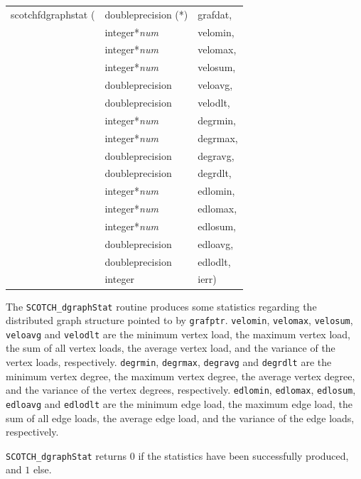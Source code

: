 \begin{itemize}
{\tt\begin{tabular}{l@{}ll}
scotchfdgraphstat ( & doubleprecision (*) & grafdat, \\
                    & integer*{\it num}   & velomin, \\
                    & integer*{\it num}   & velomax, \\
                    & integer*{\it num}   & velosum, \\
                    & doubleprecision     & veloavg, \\
                    & doubleprecision     & velodlt, \\
                    & integer*{\it num}   & degrmin, \\
                    & integer*{\it num}   & degrmax, \\
                    & doubleprecision     & degravg, \\
                    & doubleprecision     & degrdlt, \\
                    & integer*{\it num}   & edlomin, \\
                    & integer*{\it num}   & edlomax, \\
                    & integer*{\it num}   & edlosum, \\
                    & doubleprecision     & edloavg, \\
                    & doubleprecision     & edlodlt, \\
                    & integer             & ierr)
\end{tabular}}

\progdes

The {\tt SCOTCH\_dgraphStat} routine produces some statistics regarding
the distributed graph structure pointed to by {\tt grafptr}.
{\tt velomin}, {\tt velomax}, {\tt velosum}, {\tt veloavg} and
{\tt velodlt} are the minimum vertex load, the maximum vertex
load, the sum of all vertex loads, the average vertex load,
and the variance of the vertex loads, respectively.
{\tt degrmin}, {\tt degrmax}, {\tt degravg} and
{\tt degrdlt} are the minimum vertex degree, the maximum vertex
degree, the average vertex degree, and the variance of the vertex
degrees, respectively.
{\tt edlomin}, {\tt edlomax}, {\tt edlosum}, {\tt edloavg} and
{\tt edlodlt} are the minimum edge load, the maximum edge
load, the sum of all edge loads, the average edge load,
and the variance of the edge loads, respectively.

\progret

{\tt SCOTCH\_dgraphStat} returns $0$ if the statistics have been
successfully produced, and $1$ else.
\end{itemize}

